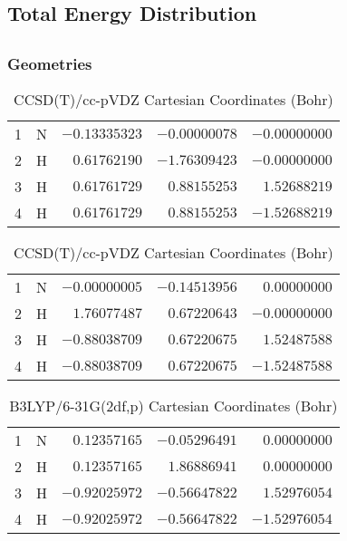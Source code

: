 \documentclass[10pt,oneside]{article}
\begin{document}
\begin{table}
\subsection*{Total Energy Distribution}
\centering\end{table}

\clearpage

\subsection{}

\begin{table}[h!]
\subsubsection*{Geometries}
\begin{multicols}{2}
\centering
\caption{CCSD(T)/cc-pVTZ Cartesian Coordinates (Bohr)}
\begin{tabular}{llrrr}
\toprule
1  & N  & $-0.13335323$ & $-0.00000078$ & $-0.00000000$ \\
2  & H  & $ 0.61762190$ & $-1.76309423$ & $-0.00000000$ \\
3  & H  & $ 0.61761729$ & $ 0.88155253$ & $ 1.52688219$ \\
4  & H  & $ 0.61761729$ & $ 0.88155253$ & $-1.52688219$ \\
\bottomrule
\end{tabular}
\caption{CCSD(T)/cc-pVDZ Cartesian Coordinates (Bohr)}
\begin{tabular}{llrrr}
\toprule
1  & N  & $-0.00000005$ & $-0.14513956$ & $ 0.00000000$ \\
2  & H  & $ 1.76077487$ & $ 0.67220643$ & $-0.00000000$ \\
3  & H  & $-0.88038709$ & $ 0.67220675$ & $ 1.52487588$ \\
4  & H  & $-0.88038709$ & $ 0.67220675$ & $-1.52487588$ \\
\bottomrule
\end{tabular}
\end{multicols}
\end{table}

\begin{table}[h]
\centering
\caption{B3LYP/6-31G(2df,p) Cartesian Coordinates (Bohr)}
\begin{tabular}{llrrr}
\toprule
1  & N  & $ 0.12357165$ & $-0.05296491$ & $ 0.00000000$ \\
2  & H  & $ 0.12357165$ & $ 1.86886941$ & $ 0.00000000$ \\
3  & H  & $-0.92025972$ & $-0.56647822$ & $ 1.52976054$ \\
4  & H  & $-0.92025972$ & $-0.56647822$ & $-1.52976054$ \\
\bottomrule
\end{tabular}
\end{table}
\end{document}
